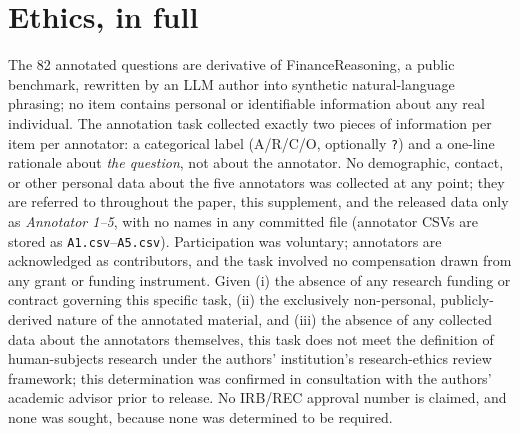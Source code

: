 \documentclass[11pt]{article}
\begin{document}
\section{Ethics, in full}
The 82 annotated questions are derivative of FinanceReasoning, a public benchmark, rewritten by
an LLM author into synthetic natural-language phrasing; no item contains personal or
identifiable information about any real individual. The annotation task collected exactly two
pieces of information per item per annotator: a categorical label (A/R/C/O, optionally
\texttt{?}) and a one-line rationale about \emph{the question}, not about the annotator. No
demographic, contact, or other personal data about the five annotators was collected at any
point; they are referred to throughout the paper, this supplement, and the released data only as
\emph{Annotator 1--5}, with no names in any committed file (annotator CSVs are stored as
\texttt{A1.csv}--\texttt{A5.csv}). Participation was voluntary; annotators are acknowledged as
contributors, and the task involved no compensation drawn from any grant or funding
instrument. Given (i) the absence of any research funding or contract governing this specific
task, (ii) the exclusively non-personal, publicly-derived nature of the annotated material, and
(iii) the absence of any collected data about the annotators themselves, this task does not meet
the definition of human-subjects research under the authors' institution's research-ethics
review framework; this determination was confirmed in consultation with the authors' academic
advisor prior to release. No IRB/REC approval number is claimed, and none was sought, because
none was determined to be required.
\end{document}
